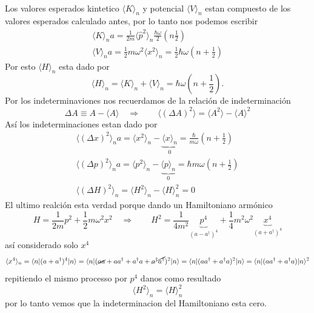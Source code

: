 \begin{solucion}
\begin{align*}
\end{align*}
Los valores esperados kintetico $\langle K \rangle_n$ y potencial $\langle V
\rangle_n$ estan compuesto de los valores esperados calculado antes, por lo
tanto nos podemos escribir
\begin{align*}
	\langle K \rangle_n a= \frac{1}{2m} \langle \hat p^2 \rangle_n \frac{\hbar
\omega}{2} \left( n \frac{1}{2} \right) \\
	\langle V \rangle_n a=  \frac{1}{2} m \omega^2 \langle x^2 \rangle_n =
\frac{1}{2} \hbar \omega \left( n + \frac{1}{2} \right)
\end{align*}
Por esto $\langle H \rangle_n$  esta dado por
\begin{equation*}
	\langle H \rangle_n = \langle K \rangle_n + \langle V \rangle_n = \hbar
\omega \left( n + \frac{1}{2} \right).
\end{equation*}
Por los indeterminaviones nos recuerdamos de la relación de indeterminación
\begin{equation*}
	\Delta A \equiv A - \langle A \rangle \quad \Rightarrow \qquad \langle
(\Delta A)^2 \rangle = \langle A^2 \rangle - \langle A \rangle^2
\end{equation*}
Así los indeterminaciones estan dado por
\begin{align*}
	\langle (\Delta x)^2 \rangle_n a= \langle x^2 \rangle_n -
\underbrace{\langle x \rangle_n}_0 = \frac{\hbar}{m\omega} \left( n +
\frac{1}{2}\right) \\
	\langle (\Delta p)^2 \rangle_n a= \langle p^2 \rangle_n -
\underbrace{\langle p \rangle_n}_0 = \hbar m \omega \left(n + \frac{1}{2}
\right) \\
	\langle (\Delta H)^2 \rangle_n = \langle H^2 \rangle_n - \langle H
\rangle_n^2 = 0
\end{align*}
El ultimo realción esta verdad porque dando un Hamiltoniano armónico
\begin{equation*}
	H = \frac{1}{2m} p^2 + \frac{1}{2} m \omega^2 x^2 \quad \Rightarrow \qquad
H^2 = \frac{1}{4m^2} \underbrace{p^4}_{(a-a^\dagger)^4} + \frac{1}{4} m^2
\omega^2 \underbrace{x^4}_{(a+a^\dagger)^4}
\end{equation*}
así considerado solo $x^4$
\begin{equation*}
	\langle x^4 \rangle_n = \langle n |(a+a^\dagger)^4 | n \rangle = \langle n |(\cancel{aa} + aa^\dagger + a^\dagger a + \cancel{a^\dagger
a^\dagger})^2 | n \rangle = \langle n |(aa^\dagger + a^\dagger a)^2 | n \rangle
= \langle n | ( a a^\dagger + a^\dagger a) | n \rangle^2  
\end{equation*}
repitiendo el mismo processo por $p^4$ danos como resultado
\begin{equation*}
	\langle H^2 \rangle_n = \langle H \rangle_n^2
\end{equation*}
por lo tanto vemos que la indeterminacion del Hamiltoniano esta cero.
\end{solucion}


